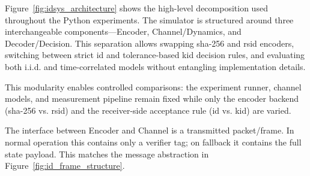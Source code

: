 Figure~\ref{fig:idsys_architecture} shows the high-level decomposition used throughout the Python experiments. The simulator is structured around three interchangeable components---Encoder, Channel/Dynamics, and Decoder/Decision. This separation allows swapping \gls{sha}-256 and \gls{rsid} encoders, switching between strict \gls{id} and tolerance-based \gls{kid} decision rules, and evaluating both i.i.d. and time-correlated models without entangling implementation details.

This modularity enables controlled comparisons: the experiment runner, channel models, and measurement pipeline remain fixed while only the encoder backend (\gls{sha}-256 vs. \gls{rsid}) and the receiver-side acceptance rule (\gls{id} vs. \gls{kid}) are varied.

The interface between Encoder and Channel is a transmitted packet/frame. In normal operation this contains only a verifier tag; on fallback it contains the full state payload. This matches the message abstraction in Figure~\ref{fig:id_frame_structure}.


